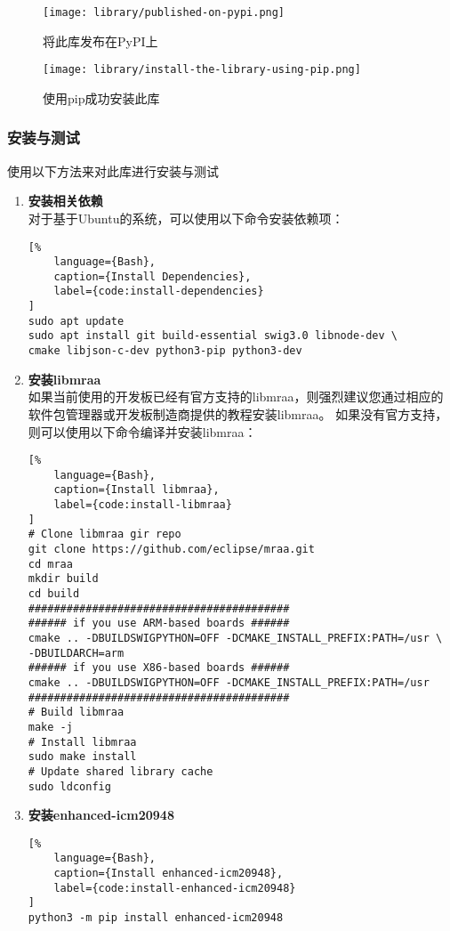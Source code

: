 \begin{figure}[H]
    \centering
    \texttt{[image: library/published-on-pypi.png]}
    \caption{\label{fig:published-on-pypi}将此库发布在PyPI上}
\end{figure}

\begin{figure}[H]
    \centering
    \texttt{[image: library/install-the-library-using-pip.png]}
    \caption{\label{fig:install-the-library-using-pip}使用pip成功安装此库}
\end{figure}

\subsubsection{安装与测试}
使用以下方法来对此库进行安装与测试

\begin{enumerate}[label=(\alph*)]
    \item {\bfseries 安装相关依赖} \\
对于基于Ubuntu的系统，可以使用以下命令安装依赖项：
\begin{lstlisting}[%
    language={Bash},
    caption={Install Dependencies},
    label={code:install-dependencies}
]
sudo apt update
sudo apt install git build-essential swig3.0 libnode-dev \ 
cmake libjson-c-dev python3-pip python3-dev
\end{lstlisting}
    \item {\bfseries 安装libmraa} \\
如果当前使用的开发板已经有官方支持的libmraa，则强烈建议您通过相应的软件包管理器或开发板制造商提供的教程安装libmraa。
如果没有官方支持，则可以使用以下命令编译并安装libmraa：
\begin{lstlisting}[%
    language={Bash},
    caption={Install libmraa},
    label={code:install-libmraa}
]
# Clone libmraa gir repo
git clone https://github.com/eclipse/mraa.git
cd mraa
mkdir build
cd build
#########################################
###### if you use ARM-based boards ######
cmake .. -DBUILDSWIGPYTHON=OFF -DCMAKE_INSTALL_PREFIX:PATH=/usr \ 
-DBUILDARCH=arm
###### if you use X86-based boards ######
cmake .. -DBUILDSWIGPYTHON=OFF -DCMAKE_INSTALL_PREFIX:PATH=/usr
#########################################
# Build libmraa
make -j
# Install libmraa
sudo make install
# Update shared library cache
sudo ldconfig
\end{lstlisting}
    \item {\bfseries 安装enhanced-icm20948} \\
\begin{lstlisting}[%
    language={Bash},
    caption={Install enhanced-icm20948},
    label={code:install-enhanced-icm20948}
]
python3 -m pip install enhanced-icm20948
\end{lstlisting}
\end{enumerate}

